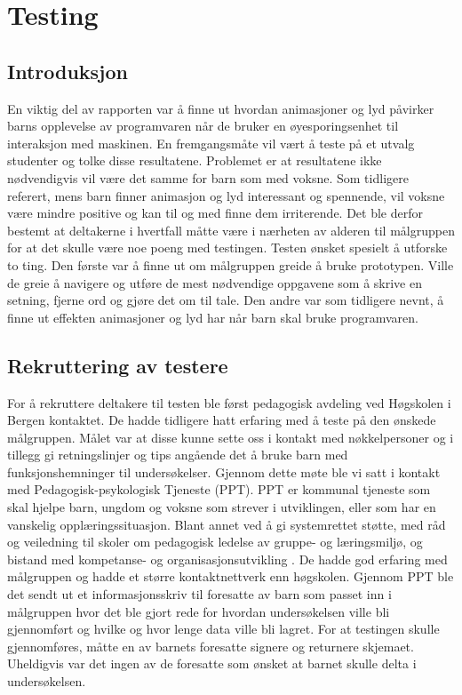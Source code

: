  
 
\chapter{Testing} 
 
 
 
\section{Introduksjon} 
 
 
En viktig del av rapporten var å finne ut hvordan animasjoner og lyd påvirker barns opplevelse av programvaren når de bruker en øyesporingsenhet til interaksjon med maskinen. En fremgangsmåte vil vært å teste på et utvalg studenter og tolke disse resultatene. Problemet er at resultatene ikke nødvendigvis vil være det samme for barn som med voksne. Som tidligere referert, mens barn finner animasjon og lyd interessant og spennende, vil voksne være mindre positive og kan til og med finne dem irriterende. Det ble derfor bestemt at deltakerne i  hvertfall måtte være i nærheten av alderen til målgruppen for at det skulle være noe poeng med testingen. Testen ønsket spesielt å utforske to ting. Den første var å finne ut om målgruppen greide å bruke prototypen. Ville de greie å navigere og utføre de mest nødvendige oppgavene som å skrive en setning, fjerne ord og gjøre det om til tale. Den andre var som tidligere nevnt, å finne ut effekten animasjoner og lyd har når barn skal bruke programvaren.  
 
 

\section{Rekruttering av testere} 
 
 
For å rekruttere deltakere til testen ble først pedagogisk avdeling ved Høgskolen i Bergen kontaktet. De hadde tidligere hatt erfaring med å teste på den ønskede målgruppen. Målet var at disse kunne sette oss i kontakt med nøkkelpersoner og i tillegg gi retningslinjer og tips angående det å bruke barn med funksjonshemninger til undersøkelser. Gjennom dette møte ble vi satt i kontakt med Pedagogisk-psykologisk Tjeneste (PPT). PPT er kommunal tjeneste som skal hjelpe barn, ungdom og voksne som strever i utviklingen, eller som har en vanskelig opplæringssituasjon. Blant annet ved å gi systemrettet støtte, med råd og veiledning til skoler om pedagogisk ledelse av gruppe- og læringsmiljø, og bistand med kompetanse- og organisasjonsutvikling \cite{Udir.5:online}. De hadde god erfaring med målgruppen og hadde et større kontaktnettverk enn høgskolen. Gjennom PPT ble det sendt ut et informasjonsskriv til foresatte av barn som passet inn i målgruppen hvor det ble gjort rede for hvordan undersøkelsen ville bli gjennomført og hvilke og hvor lenge data ville bli lagret. For at testingen skulle gjennomføres, måtte en av barnets foresatte signere og returnere skjemaet. Uheldigvis var det ingen av de foresatte som ønsket at barnet skulle delta i undersøkelsen. 

